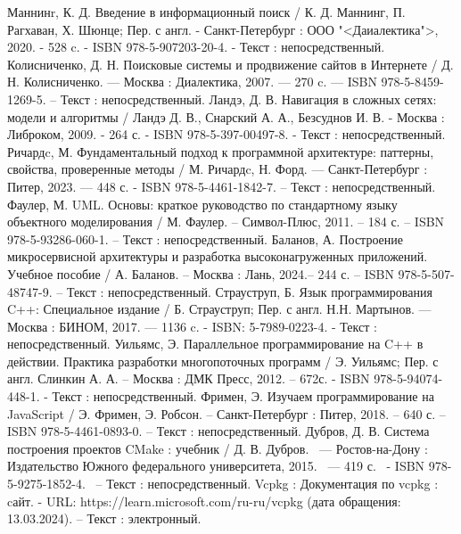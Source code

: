 
\begin{thebibliography}{51}
	 Маннинr, К. Д. Введение в информационный поиск / К. Д. Маннинг, П. Рагхаван, Х. Шюнце; Пер. с англ. - Санкт-Петербург : ООО "<Даиалектика">, 2020. - 528 c. - ISBN  978-5-907203-20-4. - Текст : непосредственный.
	 Колисниченко, Д. Н. Поисковые системы и продвижение сайтов в Интернете / Д. Н. Колисниченко. — Москва : Диалектика, 2007. — 270 c. — ISBN 978-5-8459-1269-5. – Текст : непосредственный.
	 Ландэ, Д. В. Навигация в сложных сетях: модели и алгоритмы / Ландэ Д. В., Снарский А. А., Безсуднов И. В. - Москва : Либроком, 2009. - 264 с. - ISBN 978-5-397-00497-8. - Текст : непосредственный.
	 Ричардc, М. Фундаментальный подход к программной архитектуре: паттерны, свойства, проверенные методы / М. Ричардc, Н. Форд. — Санкт-Петербург : Питер, 2023. — 448 с. - ISBN 978-5-4461-1842-7. – Текст : непосредственный.
	 Фаулер, М. UML. Основы: краткое руководство по стандартному языку объектного моделирования / М. Фаулер. – Символ-Плюс, 2011. – 184 с. – ISBN 978-5-93286-060-1. – Текст : непосредственный.
     Баланов, А. Построение микросервисной архитектуры и разработка высоконагруженных приложений. Учебное пособие / А. Баланов. – Москва : Лань, 2024.– 244 с. – ISBN 978-5-507-48747-9. – Текст : непосредственный.
	 Страуструп, Б. Язык программирования C++: Специальное издание / Б. Страуструп; Пер. с англ. Н.Н. Мартынов. — Москва : БИНОМ, 2017. — 1136 c. - ISBN: 5-7989-0223-4. - Текст : непосредственный.
	 Уильямс, Э. Параллельное программирование на C++ в действии. Практика разработки многопоточных программ / Э. Уильямс; Пер. с англ. Слинкин А. А. – Москва : ДМК Пресс, 2012. – 672с. - ISBN 978-5-94074-448-1. - Текст : непосредственный.
	  Фримен, Э. Изучаем программирование на JavaScript / Э. Фримен, Э. Робсон. – Санкт-Петербург : Питер, 2018. – 640 с. – ISBN 978-5-4461-0893-0. – Текст : непосредственный.	
	 Дубров, Д. В. Система построения проектов CMake : учебник / Д. В. Дубров. ~— Ростов-на-Дону : Издательство Южного федерального университета, 2015. ~— 419 с. ~- ISBN 978-5-9275-1852-4. ~– Текст : непосредственный.
	 Vcpkg : Документация по vcpkg : cайт. - URL: https://learn.microsoft.com/ru-ru/vcpkg (дата обращения: 13.03.2024). – Текст : электронный.

\end{thebibliography}
